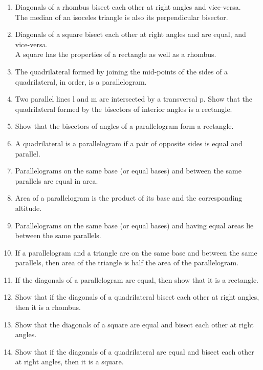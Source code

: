 \begin{enumerate}[label=\arabic*.,ref=\thesubsection.\theenumi]
%
\item  Diagonals of a rhombus bisect each other at right angles and vice-versa. 
%
\\
\solution The median of an isoceles triangle is also its perpendicular bisector.
%
\item  Diagonals of a square bisect each other at right angles and are equal, and vice-versa. 
%
\\
\solution A square has the properties of a rectangle as well as a rhombus.
%
%
\item  The quadrilateral formed by joining the mid-points of the sides of a quadrilateral, in order, is a parallelogram.
%
%
\item Two parallel lines l and m are intersected by a transversal p. Show that the quadrilateral formed by the bisectors of interior angles is a rectangle.
%
\item Show that the bisectors of angles of a parallelogram form a rectangle.
%
\item A quadrilateral is a parallelogram if a pair of opposite sides is equal and parallel.
%
\item Parallelograms on the same base (or equal bases) and between the same parallels are equal in area.
\item Area of a parallelogram is the product of its base and the corresponding altitude. 
\item Parallelograms on the same base (or equal bases) and having equal areas lie between the same parallels.
\item If a parallelogram and a triangle are on the same base and between the same parallels, then area of the triangle is half the area of the parallelogram.
%
\item If the diagonals of a parallelogram are equal, then show that it is a rectangle. 
\item Show that if the diagonals of a quadrilateral bisect each other at right angles, then it is a rhombus.
\item Show that the diagonals of a square are equal and bisect each other at right angles. 
\item Show that if the diagonals of a quadrilateral are equal and bisect each other at right angles, then it is a square.
%
\end{enumerate}
